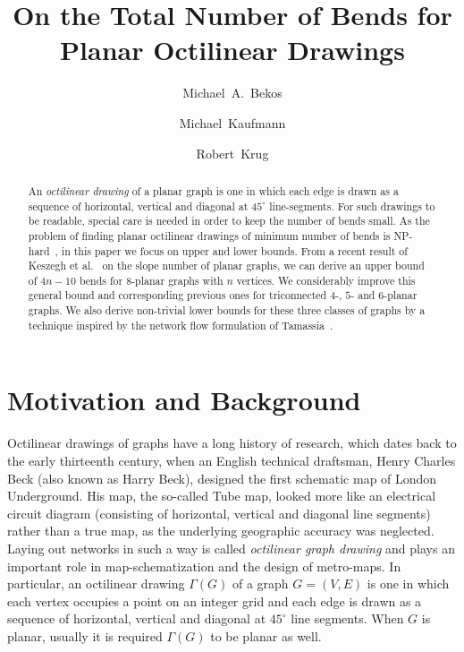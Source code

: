\documentclass[a4paper,twoside,11pt]{article}
\begin{document}
 
\title{On the Total Number of Bends for Planar Octilinear Drawings}
\author[1]{Michael~A.~Bekos}
\author[1]{Michael~Kaufmann}
\author[1]{Robert~Krug}
\date{}
\newtheorem{lemma}{Lemma}
\newtheorem{theorem}{Theorem}
\newtheorem{definition}{Definition}


\maketitle

\begin{abstract}
An \emph{octilinear drawing} of a planar graph is one in which each
edge is drawn as a sequence of horizontal, vertical and diagonal at
$45^\circ$ line-segments. For such drawings to be readable, special
care is needed in order to keep the number of bends small. As the
problem of finding planar octilinear drawings of minimum number of
bends is NP-hard~\cite{Noellenburg05}, in this paper we focus on
upper and lower bounds. From a recent result of Keszegh et
al.~\cite{KPP13} on the slope number of planar graphs, we can derive
an upper bound of  $4n-10$ bends for $8$-planar graphs with $n$
vertices. We considerably improve this general bound and
corresponding previous ones for triconnected $4$-, $5$- and
$6$-planar graphs. We also derive non-trivial lower bounds for these
three classes of graphs by a technique inspired by the network flow
formulation of Tamassia~\cite{Tamassia87}.
\end{abstract}



\section{Motivation and Background}
\label{sec:introduction}


Octilinear drawings of graphs have a long history of research, which
dates back to the early thirteenth century, when an English technical
draftsman, Henry Charles Beck (also known as Harry Beck), designed
the first schematic map of London Underground. His map, the so-called
Tube map, looked more like an electrical circuit diagram (consisting
of horizontal, vertical and diagonal line segments) rather than a
true map, as the underlying geographic accuracy was neglected. Laying
out networks in such a way is called \emph{octilinear graph drawing}
and plays an important role in map-schematization and the design of
metro-maps. In particular, an octilinear drawing $\Gamma(G)$ of a
graph $G=(V,E)$ is one in which each vertex occupies a point on an
integer grid and each edge is drawn as a sequence of horizontal,
vertical and diagonal at $45^\circ$ line segments. When $G$ is
planar, usually it is required $\Gamma(G)$ to be planar as well.
\end{document}
